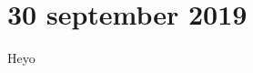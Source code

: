 \documentclass[main.tex]{subfiles}
\begin{document}
\section*{30 september 2019}

Heyo
\end{document}
